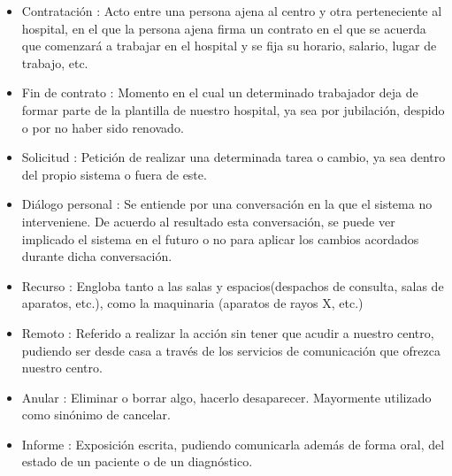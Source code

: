\begin{itemize}
\item Contratación : Acto entre una persona ajena al centro y otra perteneciente al hospital, en el que la persona ajena firma un contrato en el que se acuerda que comenzará a trabajar en el hospital y se fija su horario, salario, lugar de trabajo, etc.

\item Fin de contrato : Momento en el cual un determinado trabajador deja de formar parte de la plantilla de nuestro hospital, ya sea por jubilación, despido o por no haber sido renovado.

\item Solicitud : Petición de realizar una determinada tarea o cambio, ya sea dentro del propio sistema o fuera de este.

\item Diálogo personal : Se entiende por una conversación en la que el sistema no interveniene. De acuerdo al resultado esta conversación, se puede ver implicado el sistema en el futuro o no para aplicar los cambios acordados durante dicha conversación.

\item Recurso : Engloba tanto a las salas y espacios(despachos de consulta, salas de aparatos, etc.), como la maquinaria (aparatos de rayos X, etc.)

\item Remoto : Referido a realizar la acción sin tener que acudir a nuestro centro, pudiendo ser desde casa a través de los servicios de comunicación que ofrezca nuestro centro.

\item Anular : Eliminar o borrar algo, hacerlo desaparecer. Mayormente utilizado como sinónimo de cancelar.

\item Informe :  Exposición escrita, pudiendo comunicarla además de forma oral, del estado de un paciente o de un diagnóstico.

\end{itemize}
